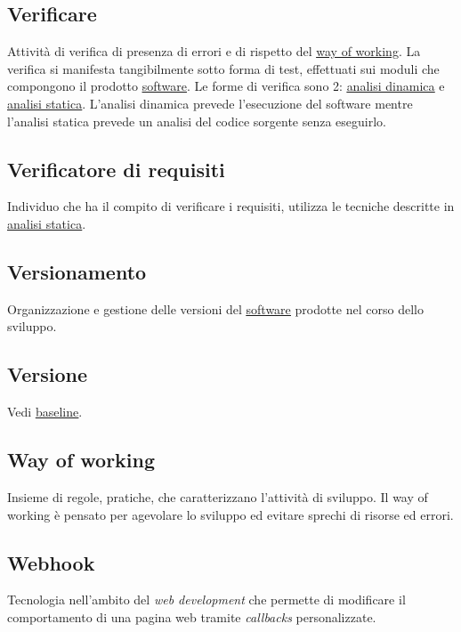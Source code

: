 	\subsection{Verificare}
	\label{sec:verificare}
	Attività di verifica di presenza di errori e di rispetto del \underline{\hyperref[sec:wow]{way of working}}. La verifica si manifesta tangibilmente sotto forma di test, effettuati sui moduli che compongono il prodotto \underline{\hyperref[sec:prodottosoftware]{software}}. Le forme di verifica sono 2: \hyperref[sec:analisidinamica]{\underline{analisi dinamica}} e \hyperref[sec:analisistatica]{\underline{analisi statica}}. L'analisi dinamica prevede l'esecuzione del software mentre l'analisi statica prevede un analisi del codice sorgente senza eseguirlo.


	\subsection{Verificatore di requisiti}
	\label{sec:verificatorerequisiti}
	Individuo che ha il compito di verificare i requisiti, utilizza le tecniche descritte in \underline{\hyperref[sec:analisistatica]{analisi statica}}.


	\subsection{Versionamento}
	\label{sec:versionamento}
	Organizzazione e gestione delle versioni del \underline{\hyperref[sec:prodottosoftware]{software}} prodotte nel corso dello sviluppo.


	\subsection{Versione}
	\label{sec:versione}
	Vedi \underline{\hyperref[sec:baseline]{baseline}}.


	\newpage


	\subsection{Way of working}
	\label{sec:wow}
	Insieme di regole, pratiche, che caratterizzano l'attività di sviluppo. Il way of working è pensato per agevolare lo sviluppo ed evitare sprechi di risorse ed errori.


	\subsection{Webhook}
	\label{sec:webhook}
	Tecnologia nell'ambito del \emph{web development} che permette di modificare il comportamento di una pagina web tramite \emph{callbacks} personalizzate.



